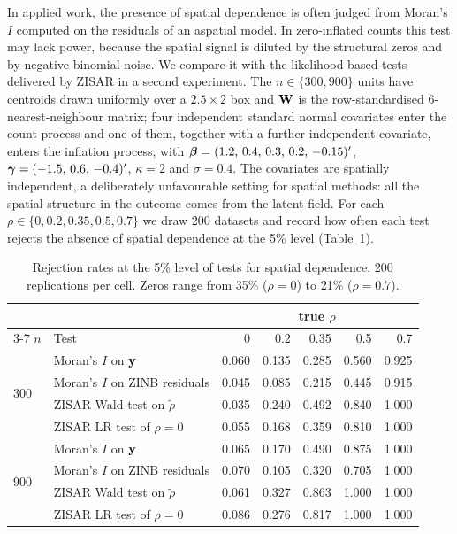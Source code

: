 In applied work, the presence of spatial dependence is often judged from Moran's $I$ \citep{moran1950,cliff_ord1973} computed on the residuals of an aspatial model.
In zero-inflated counts this test may lack power, because the spatial signal is diluted by the structural zeros and by negative binomial noise.
We compare it with the likelihood-based tests delivered by ZISAR in a second experiment.
The $n\in\{300, 900\}$ units have centroids drawn uniformly over a $2.5\times2$ box and $\mathbf{W}$ is the row-standardised 6-nearest-neighbour matrix; four independent standard normal covariates enter the count process and one of them, together with a further independent covariate, enters the inflation process, with
$\boldsymbol{\beta} = (1.2,\, 0.4,\, 0.3,\, 0.2,\, -0.15)'$, $\boldsymbol{\gamma} = (-1.5,\, 0.6,\, -0.4)'$, $\kappa = 2$ and $\sigma = 0.4$.
The covariates are spatially independent, a deliberately unfavourable setting for spatial methods: all the spatial structure in the outcome comes from the latent field.
For each $\rho\in\{0, 0.2, 0.35, 0.5, 0.7\}$ we draw 200 datasets and record how often each test rejects the absence of spatial dependence at the 5\% level (Table~\ref{tab:power_moran}).

\begin{table}[htbp]
\centering
\caption{Rejection rates at the 5\% level of tests for spatial dependence, 200 replications per cell. Zeros range from 35\% ($\rho=0$) to 21\% ($\rho=0.7$).}\label{tab:power_moran}
\small
\begin{tabular}{ll rrrrr}
\toprule
& & \multicolumn{5}{c}{true $\rho$} \\
\cmidrule(lr){3-7}
$n$ & Test & 0 & 0.2 & 0.35 & 0.5 & 0.7 \\
\midrule
\multirow{4}{*}{300}
 & Moran's $I$ on $\mathbf{y}$             & 0.060 & 0.135 & 0.285 & 0.560 & 0.925 \\
 & Moran's $I$ on ZINB residuals    & 0.045 & 0.085 & 0.215 & 0.445 & 0.915 \\
 & ZISAR Wald test on $\tilde\rho$  & 0.035 & 0.240 & 0.492 & 0.840 & 1.000 \\
 & ZISAR LR test of $\rho=0$        & 0.055 & 0.168 & 0.359 & 0.810 & 1.000 \\
\midrule
\multirow{4}{*}{900}
 & Moran's $I$ on $\mathbf{y}$             & 0.065 & 0.170 & 0.490 & 0.875 & 1.000 \\
 & Moran's $I$ on ZINB residuals    & 0.070 & 0.105 & 0.320 & 0.705 & 1.000 \\
 & ZISAR Wald test on $\tilde\rho$  & 0.061 & 0.327 & 0.863 & 1.000 & 1.000 \\
 & ZISAR LR test of $\rho=0$        & 0.086 & 0.276 & 0.817 & 1.000 & 1.000 \\
\bottomrule
\end{tabular}
\end{table}

